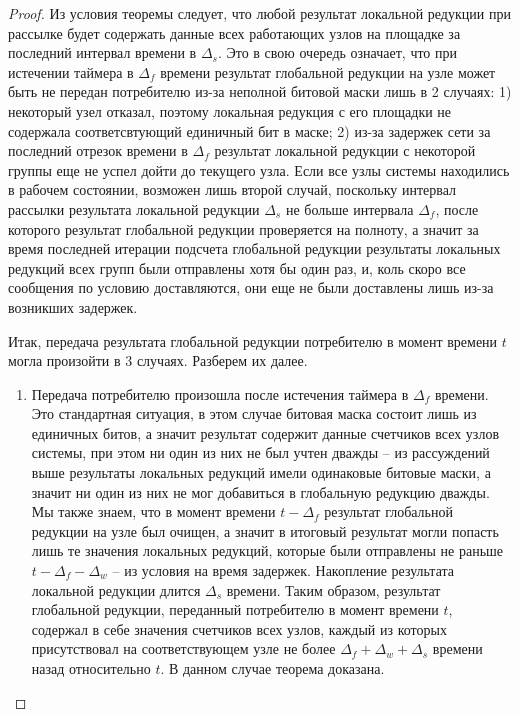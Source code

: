 \documentclass{article}
\theoremstyle{plain}
\theoremstyle{plain}
\theoremstyle{plain}
\theoremstyle{plain}
\theoremstyle{definition}
\theoremstyle{remark}
\theoremstyle{plain}
\begin{document}
\begin{proof}
    Из условия теоремы следует, что любой результат локальной редукции при рассылке будет содержать данные всех работающих узлов на площадке за последний интервал времени в $\Delta_s$. Это в свою очередь означает, что при истечении таймера в $\Delta_f$ времени результат глобальной редукции на узле может быть не передан потребителю из-за неполной битовой маски лишь в 2 случаях: 1) некоторый узел отказал, поэтому локальная редукция с его площадки не содержала соответсвтующий единичный бит в маске; 2) из-за задержек сети за последний отрезок времени в $\Delta_f$ результат локальной редукции с некоторой группы еще не успел дойти до текущего узла. Если все узлы системы находились в рабочем состоянии, возможен лишь второй случай, поскольку интервал рассылки результата локальной редукции $\Delta_s$ не больше интервала $\Delta_f$, после которого результат глобальной редукции проверяется на полноту, а значит за время последней итерации подсчета глобальной редукции результаты локальных редукций всех групп были отправлены хотя бы один раз, и, коль скоро все сообщения по условию доставляются, они еще не были доставлены лишь из-за возникших задержек.
    
    Итак, передача результата глобальной редукции потребителю в момент времени $t$ могла произойти в 3 случаях. Разберем их далее.
    
    \begin{enumerate}
        \item Передача потребителю произошла после истечения таймера в $\Delta_f$ времени. Это стандартная ситуация, в этом случае битовая маска состоит лишь из единичных битов, а значит результат содержит данные счетчиков всех узлов системы, при этом ни один из них не был учтен дважды -- из рассуждений выше результаты локальных редукций имели одинаковые битовые маски, а значит ни один из них не мог добавиться в глобальную редукцию дважды. Мы также знаем, что в момент времени $t - \Delta_f$ результат глобальной редукции на узле был очищен, а значит в итоговый результат могли попасть лишь те значения локальных редукций, которые были отправлены не раньше $t - \Delta_f - \Delta_w$ -- из условия на время задержек. Накопление результата локальной редукции длится $\Delta_s$ времени. Таким образом, результат глобальной редукции, переданный потребителю в момент времени $t$, содержал в себе значения счетчиков всех узлов, каждый из которых присутствовал на соответствующем узле не более $\Delta_f + \Delta_w + \Delta_s$ времени назад относительно $t$. В данном случае теорема доказана.
        

\end{enumerate}
\end{proof}
\end{document}
